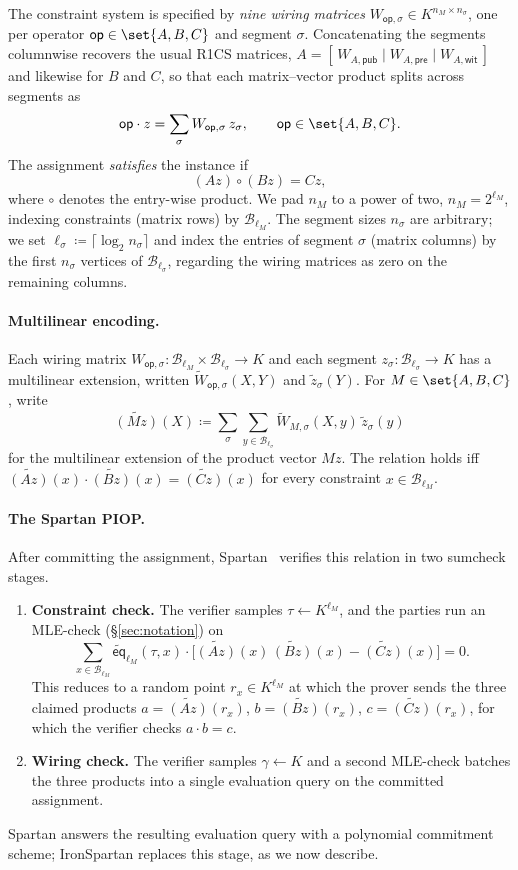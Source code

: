 \documentclass{article}
\theoremstyle{definition}
\newcommand*{\mle}{\widetilde}
\newcommand{\eq}{\mathsf{eq}}
\newcommand{\BB}{\mathcal{B}}
\begin{document}
The constraint system is specified by \emph{nine wiring matrices} $W_{\textsf{op}, \sigma} \in K^{n_M \times n_\sigma}$, one per operator $\textsf{op} \in \set{A, B, C}$ and segment $\sigma$. Concatenating the segments columnwise recovers the usual R1CS matrices, $A = [\,W_{A, \textsf{pub}} \mid W_{A, \textsf{pre}} \mid W_{A, \textsf{wit}}\,]$ and likewise for $B$ and $C$, so that each matrix--vector product splits across segments as
\[
  \textsf{op} \cdot z = \sum_{\sigma} W_{\textsf{op}, \sigma}\, z_\sigma, \qquad \textsf{op} \in \set{A, B, C}.
\]
The assignment \emph{satisfies} the instance if
\[
  (Az) \circ (Bz) = Cz,
\]
where $\circ$ denotes the entry-wise product. We pad $n_M$ to a power of two, $n_M = 2^{\ell_M}$, indexing constraints (matrix rows) by $\BB_{\ell_M}$. The segment sizes $n_\sigma$ are arbitrary; we set $\ell_\sigma \coloneqq \lceil \log_2 n_\sigma \rceil$ and index the entries of segment $\sigma$ (matrix columns) by the first $n_\sigma$ vertices of $\BB_{\ell_\sigma}$, regarding the wiring matrices as zero on the remaining columns.

\paragraph{Multilinear encoding.}
Each wiring matrix $W_{\textsf{op}, \sigma} \colon \BB_{\ell_M} \times \BB_{\ell_\sigma} \to K$ and each segment $z_\sigma \colon \BB_{\ell_\sigma} \to K$ has a multilinear extension, written $\mle{W}_{\textsf{op}, \sigma}(X, Y)$ and $\mle{z}_\sigma(Y)$. For $M \in \set{A, B, C}$, write
\[
  \mle{(Mz)}(X) \coloneqq \sum_{\sigma} \sum_{y \in \BB_{\ell_\sigma}} \mle{W}_{M, \sigma}(X, y)\, \mle{z}_\sigma(y)
\]
for the multilinear extension of the product vector $Mz$. The relation holds iff $\mle{(Az)}(x) \cdot \mle{(Bz)}(x) = \mle{(Cz)}(x)$ for every constraint $x \in \BB_{\ell_M}$.

\paragraph{The Spartan PIOP.}
After committing the assignment, Spartan~\cite{Setty:2020aa} verifies this relation in two sumcheck stages.
\begin{enumerate}
\item \textbf{Constraint check.} The verifier samples $\tau \gets K^{\ell_M}$, and the parties run an MLE-check (\S\ref{sec:notation}) on
\[
  \sum_{x \in \BB_{\ell_M}} \mle{\eq}_{\ell_M}(\tau, x) \cdot \bigl[ \mle{(Az)}(x)\, \mle{(Bz)}(x) - \mle{(Cz)}(x) \bigr] = 0.
\]
This reduces to a random point $r_x \in K^{\ell_M}$ at which the prover sends the three claimed products $a = \mle{(Az)}(r_x)$, $b = \mle{(Bz)}(r_x)$, $c = \mle{(Cz)}(r_x)$, for which the verifier checks $a \cdot b = c$.
\item \textbf{Wiring check.} The verifier samples $\gamma \gets K$ and a second MLE-check batches the three products into a single evaluation query on the committed assignment.
\end{enumerate}
Spartan answers the resulting evaluation query with a polynomial commitment scheme; IronSpartan replaces this stage, as we now describe.
\end{document}
